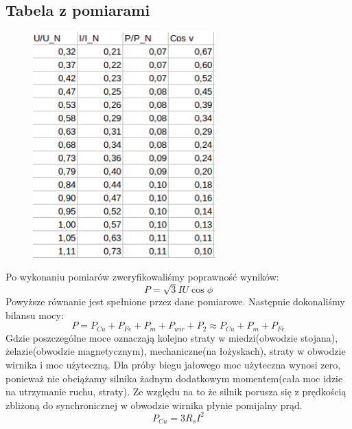 \documentclass[12pt]{article}
\begin{document}
	\subsection{Tabela z pomiarami}
		\begin{figure}[H]
			\centering
			\includegraphics[width=7cm]{jalowy_tab}
		\end{figure}
Po wykonaniu pomiarów zweryfikowaliśmy poprawność wyników:
\begin{equation}
	P=\sqrt{3}IU\cos{\phi}
\end{equation}
Powyższe równanie jest spełnione przez dane pomiarowe.\newline
Następnie dokonaliśmy bilansu mocy:
\begin{equation}
	P=P_{Cu}+P_{Fe}+P_{m}+P_{wir} + P_2 \approx P_{Cu} + P_{m} + P_{Fe}
\end{equation}
Gdzie poszczególne moce oznaczają kolejno straty w miedzi(obwodzie stojana), żelazie(obwodzie magnetycznym), mechaniczne(na łożyskach), straty w obwodzie wirnika i moc użyteczną. Dla próby biegu jałowego moc użyteczna wynosi zero, ponieważ nie obciążamy silnika żadnym dodatkowym momentem(cała moc idzie na utrzymanie ruchu, straty). Ze względu na to że silnik porusza się z prędkością zbliżoną do synchronicznej w obwodzie wirnika płynie pomijalny prąd.
\begin{equation}
	P_{Cu}=3R_sI^2
\end{equation}
\end{document}
